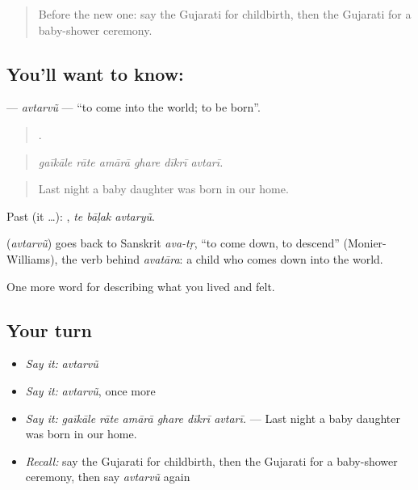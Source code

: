 \label{lesson:GU-C495-avtarvu}



\begin{quote}
Before the new one: say the Gujarati for childbirth, then the Gujarati for a baby-shower ceremony.
\end{quote}

\subsection*{You'll want to know: }
\textbf{} — \emph{avtarvũ} — \textquotedblleft{}to come into the world; to be born\textquotedblright{}.

\begin{quote}
     .
\end{quote}

\begin{quote}
\emph{gaīkāle rāte amārā ghare dīkrī avtarī.}
\end{quote}

\begin{quote}
Last night a baby daughter was born in our home.
\end{quote}

Past (it …):   , \emph{te bāḷak avtaryũ}.

\begin{cousinweb}
\textbf{} (\emph{avtarvũ}) goes back to Sanskrit \emph{ava-tṛ}, \textquotedblleft{}to come down, to descend\textquotedblright{} (Monier-Williams), the verb behind \emph{avatāra}: a child who comes down into the world.
\end{cousinweb}

\begin{grammarlens}[title={What you've built}]
One more word for describing what you lived and felt.
\end{grammarlens}

\subsection*{Your turn}
\begin{itemize}
\raggedright
  \item \emph{Say it:} \emph{avtarvũ}
  \item \emph{Say it:} \emph{avtarvũ}, once more
  \item \emph{Say it:} \emph{gaīkāle rāte amārā ghare dīkrī avtarī.} — Last night a baby daughter was born in our home.
  \item \emph{Recall:} say the Gujarati for childbirth, then the Gujarati for a baby-shower ceremony, then say \emph{avtarvũ} again
\end{itemize}


